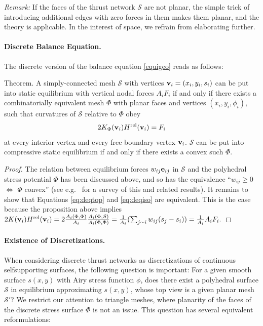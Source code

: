 \documentclass[review]{acmsiggraph}
\def\rel{{\mathord{{\rm rel}}}}
\def\SS{{\mathcal S}}
\begin{document}
{\em Remark:} If the faces of the thrust network $\SS$ are not planar,
the simple trick of introducing additional edges with zero forces in them
makes them planar, and the theory is applicable. In the interest of space, we refrain from elaborating further.


\paragraph{Discrete Balance Equation.}

The discrete version of the balance equation \eqref{equigeo} reads as 
follows:

\proclaim Theorem.
 A simply-connected mesh $\SS$ with vertices ${\mathbf v}_i=(x_i,y_i,s_i)$
can be put into static equilibrium with vertical nodal forces $A_iF_i$ if
and only if there exists a combinatorially equivalent mesh $\Phi$ with
planar faces and vertices $(x_i,y_i,\phi_i)$, such that curvatures of
$\SS$ relative to $\Phi$ obey
	\begin{equation}
	2 K_\Phi(\vw_i) H^\rel(\vw_i) = F_i
	\label{eq:deqiso}
	\end{equation}
 at every interior vertex and every free boundary vertex ${\mathbf v}_i$. $\SS$
can be put into compressive static equilibrium if and only if there exists
a convex such $\Phi$.

\begin{proof} The relation between equilibrium forces $w_{ij}{\mathbf e}_{ij}$ in 
$\SS$ and the polyhedral stress potential $\Phi$ has been discussed above, 
and so has the equivalence ``$w_{ij}\ge 0$ $\iff$ $\Phi$ convex'' (see 
e.g.\ \cite{Ash1988} for a survey of this and related results). It remains 
to show that Equations \eqref{eq:deqtop} and \eqref{eq:deqiso} are 
equivalent. This is the case because the proposition above implies
	$
	2 K(\vw_i) H^\rel(\vw_i) =
	2 \frac{A_i(\Phi,\Phi)}{A_i}
	\frac{A_i(\Phi,\SS)}{A_i(\Phi,\Phi)} =
	{1\over A_i}
	(\sum_{j\sim i} w_{ij} (s_j-s_i))
	= {1\over A_i} A_i F_i.
	$
	\end{proof}

\paragraph{Existence of Discretizations.}

When considering discrete thrust networks as discretizations of continuous 
self\dash supporting surfaces, the following question is important: For a 
given smooth surface $s(x,y)$ with Airy stress function $\phi$, does there 
exist a polyhedral surface $\SS$ in equilibrium approximating $s(x,y)$, 
whose top view is a given planar mesh $\SS'$? We restrict our attention to 
triangle meshes, where planarity of the faces of the discrete stress 
surface $\Phi$ is not an issue. This question has several equivalent 
reformulations:
\end{document}
